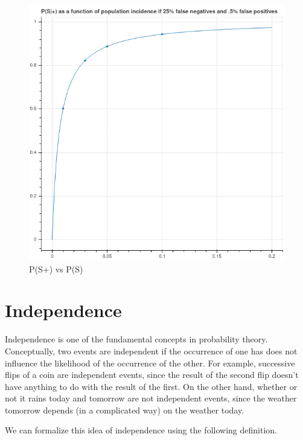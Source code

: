 \documentclass[
  11pt,
  letterpaper,
]{scrbook}
\theoremstyle{plain}
\theoremstyle{plain}
\theoremstyle{remark}
\begin{document}
\begin{figure}

{\centering \includegraphics{chapters/img/covidfn.png}

}

\caption{\label{fig-covidfn}P(S\textbar+) vs P(S)}

\end{figure}

\hypertarget{independence}{%
\section{Independence}\label{independence}}

Independence is one of the fundamental concepts in probability theory.
Conceptually, two events are independent if the occurrence of one has
does not influence the likelihood of the occurrence of the other. For
example, successive flips of a coin are independent events, since the
result of the second flip doesn't have anything to do with the result of
the first. On the other hand, whether or not it rains today and tomorrow
are not independent events, since the weather tomorrow depends (in a
complicated way) on the weather today.

We can formalize this idea of independence using the following
definition.
\end{document}
